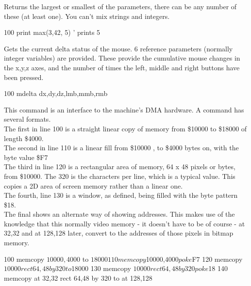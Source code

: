 \begin{entry}
Returns the largest or smallest of the parameters, there can be any number of these (at least one). You can’t mix strings and integers.

\begin{lstexample}
100 print max(3,42, 5)  ' prints 5
\end{lstexample}
\end{entry}

\begin{entry}
Gets the current delta status of the mouse. 6 reference parameters (normally integer variables) are provided. These provide the cumulative mouse changes in the x,y,z axes, and the number of times the left, middle and right buttons have been pressed.

\begin{lstexample}
100 mdelta dx,dy,dz,lmb,mmb,rmb
\end{lstexample}
\end{entry}

\begin{entry}
This command is an interface to the machine's DMA hardware. A  command has several formats. \\

The first in line 100 is a straight linear copy of memory from \$10000 to \$18000 of length \$4000.\\ The second in line 110 is a linear fill from \$10000 , to \$4000 bytes on, with the byte value \$F7 \\

The third in line 120 is a rectangular area of memory, 64 x 48 pixels or bytes, from \$10000. The 320 is the characters per line, which is a typical value. This copies a 2D area of screen memory rather than a linear one. \\

The fourth, line 130 is a window, as defined, being filled with the byte pattern \$18. \\

The final shows an alternate way of showing addresses. This makes use of the knowledge that this normally video memory - it doesn't have to be of course - at 32,32 and at 128,128 later, convert to the addresses of those pixels in bitmap memory.

\begin{lstexample}
100 memcopy $10000,$4000 to $18000
110 memcopy $10000,$4000 poke $F7
120 memcopy $10000 rect 64,48 by 320 to $18000
130 memcopy $10000 rect 64,48 by 320 poke $18
140 memcopy at 32,32 rect 64,48 by 320 to at 128,128
\end{lstexample}
\end{entry}


